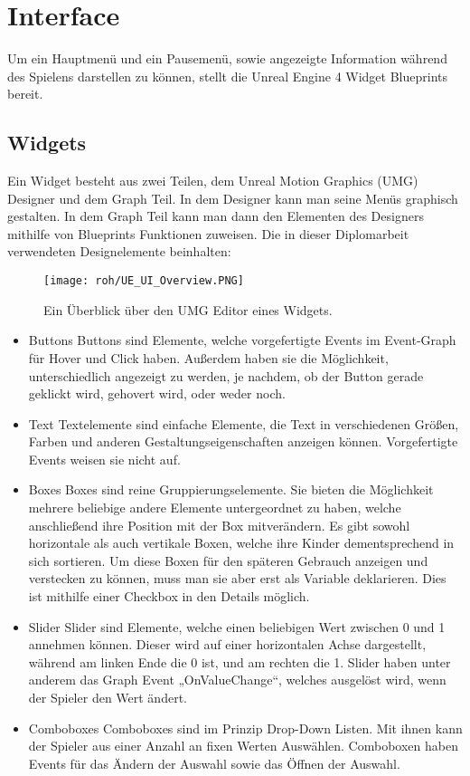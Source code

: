 \section{Interface}
Um ein Hauptmenü und ein Pausemenü, sowie angezeigte Information während des Spielens darstellen zu können, stellt die Unreal Engine 4 Widget Blueprints bereit.
\subsection{Widgets}
Ein Widget besteht aus zwei Teilen, dem Unreal Motion Graphics (UMG) Designer und dem Graph Teil.\citep{ue:UIWidgets}
In dem Designer kann man seine Menüs graphisch gestalten.
In dem Graph Teil kann man dann den Elementen des Designers mithilfe von Blueprints Funktionen zuweisen.
Die in dieser Diplomarbeit verwendeten Designelemente beinhalten:
\begin{figure}[H]
    \centering
    \texttt{[image: roh/UE\_UI\_Overview.PNG]}
    \caption{Ein Überblick über den UMG Editor eines Widgets.}
    \label{UE:UI_Overview}
\end{figure}
\begin{itemize}
    \item Buttons
    Buttons sind Elemente, welche vorgefertigte Events im Event-Graph für Hover und Click haben.
    Außerdem haben sie die Möglichkeit, unterschiedlich angezeigt zu werden, je nachdem, ob der Button gerade geklickt wird, gehovert wird, oder weder noch.
    \item Text
    Textelemente sind einfache Elemente, die Text in verschiedenen Größen, Farben und anderen Gestaltungseigenschaften anzeigen können.
    Vorgefertigte Events weisen sie nicht auf.
    \item Boxes
    Boxes sind reine Gruppierungselemente.
    Sie bieten die Möglichkeit mehrere beliebige andere Elemente untergeordnet zu haben, welche anschließend ihre Position mit der Box mitverändern.
    Es gibt sowohl horizontale als auch vertikale Boxen, welche ihre Kinder dementsprechend in sich sortieren.
    Um diese Boxen für den späteren Gebrauch anzeigen und verstecken zu können, muss man sie aber erst als Variable deklarieren.
    Dies ist mithilfe einer Checkbox in den Details möglich.
    \item Slider
    Slider sind Elemente, welche einen beliebigen Wert zwischen 0 und 1 annehmen können.
    Dieser wird auf einer horizontalen Achse dargestellt, während am linken Ende die 0 ist, und am rechten die 1.
    Slider haben unter anderem das Graph Event „OnValueChange“, welches ausgelöst wird, wenn der Spieler den Wert ändert.
    \item Comboboxes
    Comboboxes sind im Prinzip Drop-Down Listen.
    Mit ihnen kann der Spieler aus einer Anzahl an fixen Werten Auswählen.
    Comboboxen haben Events für das Ändern der Auswahl sowie das Öffnen der Auswahl.
\end{itemize}
